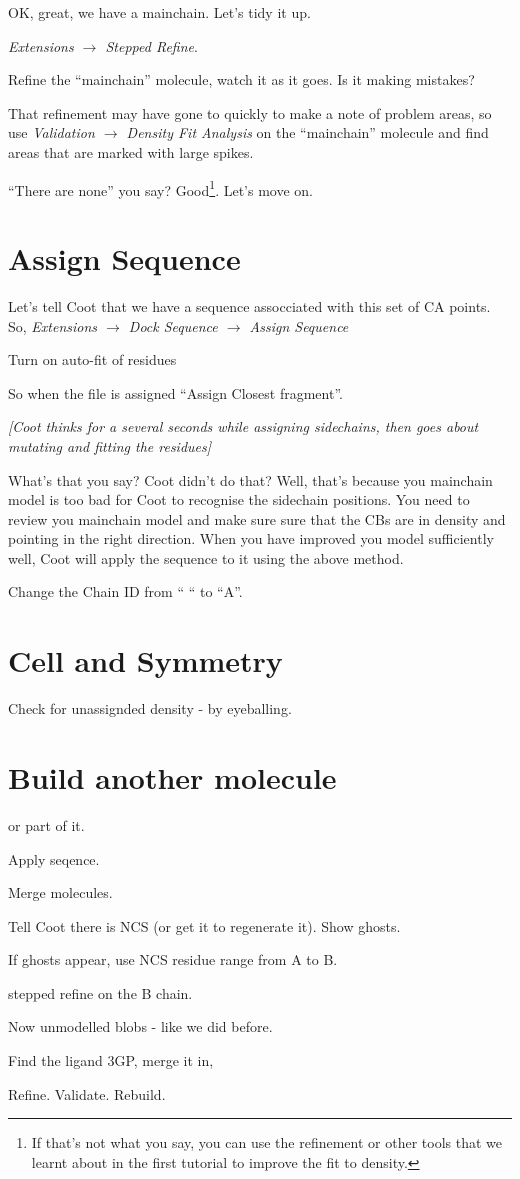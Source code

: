 \documentclass{article}
\begin{document}
OK, great, we have a mainchain.  Let's tidy it up.

\textsl{Extensions $\rightarrow$ Stepped Refine}.  

Refine the ``mainchain'' molecule, watch it as it goes.  Is it making
mistakes?

That refinement may have gone to quickly to make a note of problem areas, so use 
\textsl{Validation $\rightarrow$ Density Fit Analysis} on the
``mainchain'' molecule and find areas that are marked with large spikes.  

``There are none'' you say?  Good\footnote{If that's not what you say,
  you can use the refinement or other tools that we learnt about in
  the first tutorial to improve the fit to density.}. Let's move on.

\section{Assign Sequence}

Let's tell Coot that we have a sequence assocciated with this set
of CA points.  So, \textsl{Extensions $\rightarrow$ Dock Sequence
  $\rightarrow$ Assign Sequence}

Turn on auto-fit of residues

So when the file is assigned ``Assign Closest fragment''.

\textsl{ [Coot thinks for a several seconds while assigning
  sidechains, then goes about mutating and fitting the residues]}

What's that you say?  Coot didn't do that?  Well, that's because you
mainchain model is too bad for Coot to recognise the sidechain
positions.  You need to review you mainchain model and make sure sure
that the CBs are in density and pointing in the right direction.  When
you have improved you model sufficiently well, Coot will apply the
sequence to it using the above method.

Change the Chain ID from `` `` to ``A''.

\section{Cell and Symmetry}

Check for unassignded density - by eyeballing.

\section{Build another molecule}

or part of it.

Apply seqence.

Merge molecules.

Tell Coot there is NCS (or get it to regenerate it).  Show ghosts.  

If ghosts appear, use NCS residue range from A to B.

stepped refine on the B chain.

Now unmodelled blobs - like we did before.

Find the ligand 3GP, merge it in, 

Refine.  Validate. Rebuild.
\end{document}
